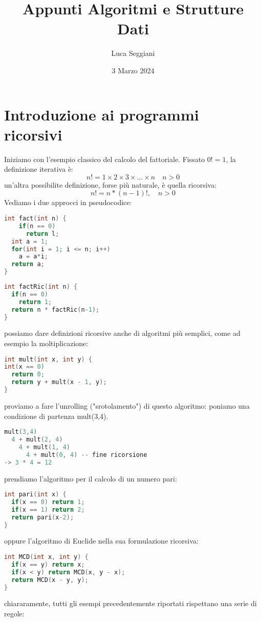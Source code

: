 \documentclass[a4paper,12pt]{article}
\title{Appunti Algoritmi e Strutture Dati}
\author{Luca Seggiani}
\date{3 Marzo 2024}
\begin{document}
\maketitle
\section{Introduzione ai programmi ricorsivi}
Iniziamo con l'esempio classico del calcolo del fattoriale. Fissato $0! = 1$, la definizione iterativa è:
$$ n! = 1 \times 2 \times 3 \times ... \times n \quad n>0 $$
un'altra possibilite definizione, forse più naturale, è quella ricorsiva:
$$ n! = n*(n-1)!, \quad n> 0 $$
Vediamo i due approcci in pseudocodice:
\begin{lstlisting}[language=C++]
  int fact(int n) {
    if(n == 0)
      return l; 
  int a = 1;
  for(int i = 1; i <= n; i++) 
    a = a*i;
  return a;
}
\end{lstlisting}

\begin{lstlisting}[language=C++]
int factRic(int n) {
  if(n == 0)
    return 1;
  return n * factRic(n-1);
}
\end{lstlisting}

possiamo dare definizioni ricorsive anche di algoritmi più semplici, come ad esempio la moltiplicazione:
\begin{lstlisting}[language=C++]
int mult(int x, int y) {
int(x == 0)
  return 0;
  return y + mult(x - 1, y);
}
\end{lstlisting}

proviamo a fare l'unrolling ("srotolamento") di questo algoritmo: poniamo una condizione di partenza mult(3,4).
\begin{lstlisting}[language=C++]
mult(3,4)
  4 + mult(2, 4)
    4 + mult(1, 4)
      4 + mult(0, 4) -- fine ricorsione
-> 3 * 4 = 12 
\end{lstlisting}

prendiamo l'algoritmo per il calcolo di un numero pari:
\begin{lstlisting}[language=C++]
int pari(int x) {
  if(x == 0) return 1;
  if(x == 1) return 2;
  return pari(x-2);
}
\end{lstlisting}
oppure l'algoritmo di Euclide nella sua formulazione ricorsiva:
\begin{lstlisting}[language=C++]
int MCD(int x, int y) {
  if(x == y) return x;
  if(x < y) return MCD(x, y - x);
  return MCD(x - y, y);
}
\end{lstlisting}

chiararamente, tutti gli esempi precedentemente riportati rispettano una serie di regole:
\end{document}
